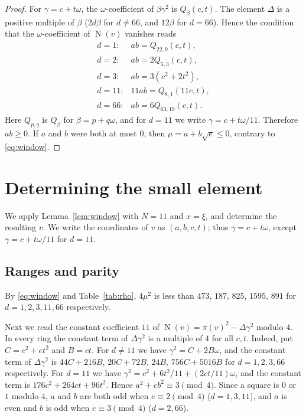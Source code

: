 \documentclass[a4paper,11pt]{article}
\theoremstyle{plain}
\theoremstyle{definition}
\theoremstyle{remark}
\numberwithin{equation}{section}
\numberwithin{table}{section}
\newcommand{\Nm}{\operatorname{N}}
\begin{document}
\begin{proof}
For $\gamma=c+t\omega$, the $\omega$-coefficient of $\beta\gamma^2$ is $Q_\beta(c,t)$.
The element $\Delta$ is a positive multiple of $\beta$ ($2d\beta$ for $d\ne66$, and $12\beta$ for $d=66$). Hence the condition that the $\omega$-coefficient of $\Nm(v)$ vanishes reads
\[
\begin{array}{rl}
d=1: & ab=Q_{22,9}(c,t),\\
d=2: & ab=2Q_{5,3}(c,t),\\
d=3: & ab=3(c^2+2t^2),\\
d=11: & 11ab=Q_{8,1}(11c,t),\\
d=66: & ab=6Q_{63,19}(c,t).
\end{array}
\]
Here $Q_{p,q}$ is $Q_\beta$ for $\beta=p+q\omega$, and for $d=11$ we write $\gamma=c+t\omega/11$.
Therefore $ab\ge0$. If $a$ and $b$ were both at most $0$, then $\mu=a+b\sqrt e\le0$, contrary to \eqref{eq:window}.
\end{proof}

\section{Determining the small element}\label{sec:small}

We apply Lemma~\ref{lem:window} with $N=11$ and $x=\xi$, and determine the resulting $v$.
We write the coordinates of $v$ as $(a,b,c,t)$; thus $\gamma=c+t\omega$, except $\gamma=c+t\omega/11$ for $d=11$.

\subsection{Ranges and parity}

By \eqref{eq:window} and Table~\ref{tab:rho}, $4\mu^2$ is less than $473$, $187$, $825$, $1595$, $891$ for $d=1,2,3,11,66$ respectively.

Next we read the constant coefficient $11$ of $\Nm(v)=\pi(v)^2-\Delta\gamma^2$ modulo $4$. In every ring the constant term of $\Delta\gamma^2$ is a multiple of $4$ for all $c,t$.
Indeed, put $C=c^2+et^2$ and $B=ct$. For $d\ne11$ we have $\gamma^2=C+2B\omega$, and the constant term of $\Delta\gamma^2$ is $44C+216B$, $20C+72B$, $24B$, $756C+5016B$ for $d=1,2,3,66$ respectively. For $d=11$ we have $\gamma^2=c^2+6t^2/11+(2ct/11)\omega$, and the constant term is $176c^2+264ct+96t^2$.
Hence $a^2+eb^2\equiv3\pmod4$. Since a square is $0$ or $1$ modulo $4$, $a$ and $b$ are both odd when $e\equiv2\pmod4$ ($d=1,3,11$), and $a$ is even and $b$ is odd when $e\equiv3\pmod4$ ($d=2,66$).
\end{document}
